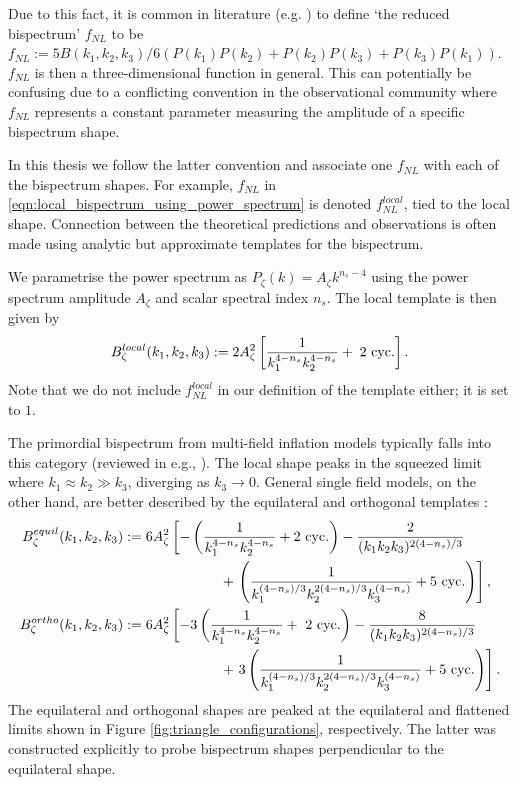 Due to this fact, it is common in literature (e.g. \cite{Burrage2011large}) to define `the reduced bispectrum' $f_{NL}$ to be $f_{NL} := 5B(k_1,k_2,k_3) / 6(P(k_1)P(k_2) + P(k_2)P(k_3) + P(k_3)P(k_1))$. $f_{NL}$ is then a three-dimensional function in general. This can potentially be confusing due to a conflicting convention in the observational community where $f_{NL}$ represents a constant parameter measuring the amplitude of a specific bispectrum shape.

In this thesis we follow the latter convention and associate one $f_{NL}$ with each of the bispectrum shapes. For example, $f_{NL}$ in \eqref{eqn:local_bispectrum_using_power_spectrum} is denoted $f_{NL}^{local}$, tied to the local shape. Connection between the theoretical predictions and observations is often made using analytic but approximate templates for the bispectrum.

We parametrise the power spectrum as $P_\zeta(k) = A_\zeta k^{n_s-4}$ using the power spectrum amplitude $A_\zeta$ and scalar spectral index $n_s$. The local template is then given by
\begin{align}
	B_\zeta^{local} (k_1, k_2, k_3) := 2A_\zeta^2 \left[ \frac{1}{k_1^{4-n_s} k_2^{4-n_s}} + \text{\;2 cyc.} \right]. \label{def:local_template} 
\end{align}
Note that we do not include $f_{NL}^{local}$ in our definition of the template either; it is set to $1$.

The primordial bispectrum from multi-field inflation models typically falls into this category (reviewed in e.g., \cite{Byrnes2010review}). The local shape peaks in the squeezed limit where ${k_1 \approx k_2 \gg k_3}$, diverging as $k_3\rightarrow0$. General single field models, on the other hand, are better described by the equilateral and orthogonal templates \cite{Creminelli2006limits,Senatore2010orthogonal}:
\begin{align}
	B_\zeta^{equil} (k_1, k_2, k_3) &:= 6A_\zeta^2 \left[ -\left( \frac{1}{k_1^{4-n_s} k_2^{4-n_s}} + \text{2 cyc.} \right) -\frac{2}{(k_1 k_2 k_3)^{2(4-n_s)/3}} \right.\nonumber\\
	&\hspace{0.2\textwidth} + \left. \left( \frac{1}{k_1^{(4-n_s)/3} k_2^{2(4-n_s)/3} k_3^{(4-n_s)}} + \text{5 cyc.} \right) \right], \label{def:equilateral_template} \\
	B_\zeta^{ortho} (k_1, k_2, k_3) &:= 6A_\zeta^2 \left[ -3\left( \frac{1}{k_1^{4-n_s} k_2^{4-n_s}} + \text{ 2 cyc.} \right) -\frac{8}{(k_1 k_2 k_3)^{2(4-n_s)/3}} \right.\nonumber\\
	&\hspace{0.2\textwidth} + \left. 3\left( \frac{1}{k_1^{(4-n_s)/3} k_2^{2(4-n_s)/3} k_3^{(4-n_s)}} + \text{5 cyc.} \right) \right]. \label{def:orthogonal_template} 
\end{align}
The equilateral and orthogonal shapes are peaked at the equilateral and flattened limits shown in Figure \ref{fig:triangle_configurations}, respectively. The latter was constructed explicitly to probe bispectrum shapes perpendicular to the equilateral shape.

